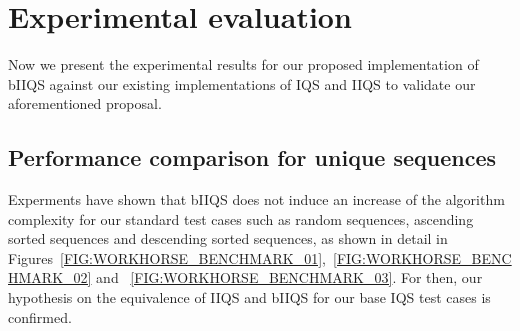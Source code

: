 \section{Experimental evaluation}

Now we present the experimental results for our proposed implementation of bIIQS against our existing implementations of IQS and IIQS to validate our aforementioned proposal.\\


\subsection{Performance comparison for unique sequences}

Experments have shown that bIIQS does not induce an increase of the algorithm complexity for our standard test cases such as random sequences, ascending sorted sequences and descending sorted sequences, as shown in detail in Figures~\ref{FIG:WORKHORSE_BENCHMARK_01},~\ref{FIG:WORKHORSE_BENCHMARK_02} and ~\ref{FIG:WORKHORSE_BENCHMARK_03}. For then, our hypothesis on the equivalence of IIQS and bIIQS for our base IQS test cases is confirmed. \\


